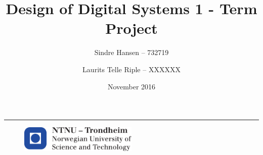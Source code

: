 \documentclass[a4paper]{article}
\title{Design of Digital Systems 1 - Term Project}
\author{
  Sindre Hansen -- 732719 \and
  Laurits Telle Riple -- XXXXXX}
\date{November 2016}
\begin{document}
\begin{titlepage}
    \maketitle
    \rule{\linewidth}{0.5mm}
    \begin{figure}
    \centering
    \includegraphics[width=0.5\textwidth]{images/logontnu_eng}
    \end{figure}
    \thispagestyle{empty}
\end{titlepage}

\tableofcontents
\thispagestyle{empty} %
\newpage
\setcounter{page}{1}

\newpage

\newpage

\newpage

\newpage

\newpage

\end{document}
